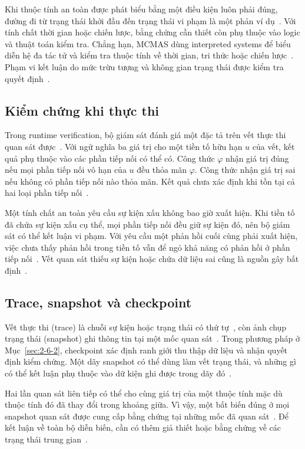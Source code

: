 \documentclass[12pt,a4paper,oneside]{extreport}
\begin{document}
Khi thuộc tính an toàn được phát biểu bằng một điều kiện luôn phải đúng, đường đi từ trạng thái khởi đầu đến trạng thái vi phạm là một phản ví dụ~\cite{ref-19}. Với tính chất thời gian hoặc chiến lược, bằng chứng cần thiết còn phụ thuộc vào logic và thuật toán kiểm tra. Chẳng hạn, MCMAS dùng interpreted systems để biểu diễn hệ đa tác tử và kiểm tra thuộc tính về thời gian, tri thức hoặc chiến lược~\cite{ref-20}. Phạm vi kết luận do mức trừu tượng và không gian trạng thái được kiểm tra quyết định~\cite{ref-22}.

\subsection{Kiểm chứng khi thực thi}\label{sec:1-6-2}

Trong runtime verification, bộ giám sát đánh giá một đặc tả trên vết thực thi quan sát được~\cite{ref-5}. Với ngữ nghĩa ba giá trị cho một tiền tố hữu hạn \(u\) của vết, kết quả phụ thuộc vào các phần tiếp nối có thể có. Công thức \(\varphi\) nhận giá trị đúng nếu mọi phần tiếp nối vô hạn của \(u\) đều thỏa mãn \(\varphi\). Công thức nhận giá trị sai nếu không có phần tiếp nối nào thỏa mãn. Kết quả chưa xác định khi tồn tại cả hai loại phần tiếp nối~\cite{ref-18}.

Một tính chất an toàn yêu cầu sự kiện xấu không bao giờ xuất hiện. Khi tiền tố đã chứa sự kiện xấu cụ thể, mọi phần tiếp nối đều giữ sự kiện đó, nên bộ giám sát có thể kết luận vi phạm. Với yêu cầu một phản hồi cuối cùng phải xuất hiện, việc chưa thấy phản hồi trong tiền tố vẫn để ngỏ khả năng có phản hồi ở phần tiếp nối~\cite{ref-18}. Vết quan sát thiếu sự kiện hoặc chứa dữ liệu sai cũng là nguồn gây bất định~\cite{ref-23}.

\subsection{Trace, snapshot và checkpoint}\label{sec:1-6-3}

Vết thực thi (trace) là chuỗi sự kiện hoặc trạng thái có thứ tự~\cite{ref-5}, còn ảnh chụp trạng thái (snapshot) ghi thông tin tại một mốc quan sát~\cite{ref-21}. Trong phương pháp ở Mục~\ref{sec:2-6-2}, checkpoint xác định ranh giới thu thập dữ liệu và nhận quyết định kiểm chứng. Một dãy snapshot có thể dùng làm vết trạng thái, và những gì có thể kết luận phụ thuộc vào dữ kiện ghi được trong dãy đó~\cite{ref-23}.

Hai lần quan sát liên tiếp có thể cho cùng giá trị của một thuộc tính mặc dù thuộc tính đó đã thay đổi trong khoảng giữa. Vì vậy, một bất biến đúng ở mọi snapshot quan sát được cung cấp bằng chứng tại những mốc đã quan sát~\cite{ref-23}. Để kết luận về toàn bộ diễn biến, cần có thêm giả thiết hoặc bằng chứng về các trạng thái trung gian~\cite{ref-5}.
\end{document}
